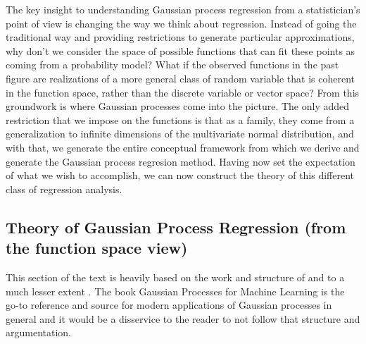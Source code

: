 The key insight to understanding Gaussian process regression from a statistician's point of view is changing the way we think about regression. Instead of going the traditional way and providing restrictions to generate particular approximations, why don't we consider the space of possible functions that can fit these points as coming from a probability model? What if the observed functions in the past figure are realizations of a more general class of random variable that is coherent in the function space, rather than the discrete variable or vector space? From this groundwork is where Gaussian processes come into the picture. The only added restriction that we impose on the functions is that as a family, they come from a generalization to infinite dimensions of the multivariate normal distribution, and with that, we generate the entire conceptual framework from which we derive and generate the Gaussian process regresion method. Having now set the expectation of what we wish to accomplish, we can now construct the theory of this different class of regression analysis. 

\subsection{Theory of Gaussian Process Regression (from the function space view)}

This section of the text is heavily based on the work and structure of \cite{rasmussen2006gaussian} and to a much lesser extent \cite{wang2020intuitive}. The book Gaussian Processes for Machine Learning is the go-to reference and source for modern applications of Gaussian processes in general and it would be a disservice to the reader to not follow that structure and argumentation. 

